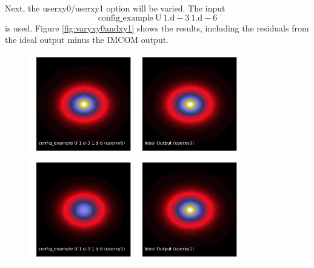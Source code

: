 \documentclass[12pt,preprint]{aastex6}
\begin{document}
Next, the userxy0/userxy1 option will be varied. The input
\begin{equation}
\mathrm{config{\_}example \ U \ 1.d-3 \ 1.d-6}
\end{equation}
is used. Figure \ref{fig:varyxy0andxy1} shows the results, including the residuals from the ideal output minus the IMCOM output.
\begin{figure}[!htbp]
\centering
\advance\leftskip-1.0cm
\advance\rightskip-1.0cm
\includegraphics[height=45mm,width=45mm]{f2a.png}
\includegraphics[height=45mm,width=45mm]{f2b.png}
\includegraphics[height=45mm,width=45mm]{f2c.png}
\includegraphics[height=45mm,width=45mm]{f2d.png}

\end{figure}
\end{document}
